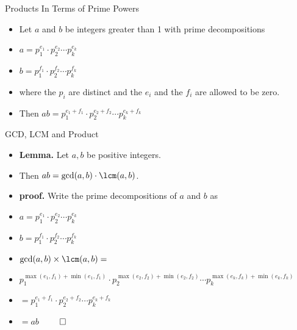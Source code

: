 \documentclass{beamer}
\begin{document}
\begin{frame}{Products In Terms of Prime Powers}

\begin{itemize}
  \item Let $a$ and $b$ be integers greater than 1 with prime decompositions
  \item $a=p_1^{e_1} \cdot p_2^{e_2} \cdots p_k^{e_k}$
  \item $b=p_1^{f_1} \cdot p_2^{f_2} \cdots p_k^{f_k}$
  \item where the $p_i$ are distinct and the $e_i$ and the $f_i$ are allowed to be zero.
  \item Then $ab = p_1^{e_1+f_1} \cdot p_2^{e_2+f_2} \cdots p_k^{e_k+f_k}$
\end{itemize}

\end{frame}

\begin{frame}{GCD, LCM and Product}

\begin{itemize}
  \item \textbf{Lemma.} Let $a,b$ be positive integers.
  \item Then $ab = \gcd(a,b) \cdot \lcm(a,b)$.
  \item \textbf{proof.} Write the prime decompositions of $a$ and $b$ as
  \item $a=p_1^{e_1} \cdot p_2^{e_2} \cdots p_k^{e_k}$
  \item $b=p_1^{f_1} \cdot p_2^{f_2} \cdots p_k^{f_k}$
  \item $\gcd(a,b)\times \lcm(a,b) =$
  \item $p_1^{\max(e_1,f_1)+\min(e_1,f_1)} \cdot p_2^{\max(e_2,f_2)+\min(e_2,f_2)} \cdots p_k^{\max(e_k,f_k)+\min(e_k,f_k)}$
  \item $=p_1^{e_1+f_1} \cdot p_2^{e_2+f_2} \cdots p_k^{e_k+f_k}$
  \item $=ab$ $\qed$
\end{itemize}

\end{frame}
\end{document}
